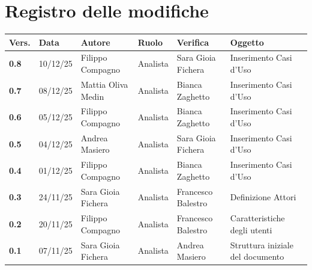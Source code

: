 \documentclass[a4paper,12pt]{article}
\begin{document}
    

    \section*{Registro delle modifiche} {
        \begin{table}[h!]
                \begin{tabularx}{\textwidth}{|l|l|l|l|L|L|}
                \hline
                \textbf{Vers.} & \textbf{Data} & \textbf{Autore} & \textbf{Ruolo} & \textbf{Verifica} & \textbf{Oggetto} \\
                \hline
                \textbf{0.8} & 10/12/25 & Filippo Compagno & Analista & Sara Gioia Fichera & Inserimento Casi d'Uso \\
                \hline
                \textbf{0.7} & 08/12/25 & Mattia Oliva Medin & Analista & Bianca Zaghetto & Inserimento Casi d'Uso \\
                \hline
                \textbf{0.6} & 05/12/25 & Filippo Compagno & Analista & Bianca Zaghetto & Inserimento Casi d'Uso \\
                \hline
                \textbf{0.5} & 04/12/25 & Andrea Masiero & Analista & Sara Gioia Fichera & Inserimento Casi d'Uso \\
                \hline
                \textbf{0.4} & 01/12/25 & Filippo Compagno & Analista & Bianca Zaghetto & Inserimento Casi d'Uso \\
                \hline
                \textbf{0.3} & 24/11/25 & Sara Gioia Fichera & Analista & Francesco Balestro &  Definizione Attori \\
                \hline
                \textbf{0.2} & 20/11/25 & Filippo Compagno & Analista & Francesco Balestro & Caratteristiche degli utenti \\
                \hline
                \textbf{0.1} & 07/11/25 & Sara Gioia Fichera & Analista & Andrea Masiero & Struttura iniziale del documento \\
                \hline
            \end{tabularx}
        \end{table}
    }
    \newpage
    
    \tableofcontents
    \newpage

    \listoffigures
    \newpage
    
    \listoftables
    \newpage
\end{document}
